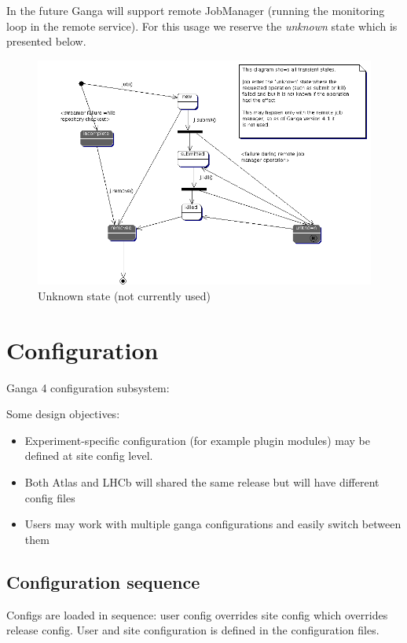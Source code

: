 \documentclass{howto}
\begin{document}
In  the  future Ganga  will  support  remote  JobManager (running  the
monitoring loop in the remote  service). For this usage we reserve the
{\em unknown} state which is presented below.


\begin{figure}
  \centering
  \includegraphics[width=5in,bb=0 0 1000 800]{./transient-states.gif}
  \caption{Unknown state (not currently used)}
\end{figure}


\section{Configuration}

Ganga 4 configuration subsystem: 

Some design objectives:

\begin{itemize}
\item Experiment-specific configuration (for example plugin modules) may be defined at site config level.
\item Both Atlas and LHCb will shared the same release but will have different config files 
\item Users may work with multiple ganga configurations and easily switch between them
\end{itemize}

\subsection{Configuration sequence}

Configs  are loaded  in sequence:  user config  overrides  site config
which overrides release config. User and site configuration is defined
in the configuration files.
\end{document}
